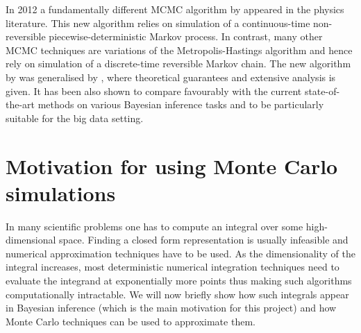 \documentclass[report.tex]{subfiles}
\begin{document}
In 2012 a fundamentally different MCMC algorithm by \citet{peters2012rejection}
appeared in the physics literature. This new algorithm relies on simulation of
a continuous-time non-reversible piecewise-deterministic Markov process. In
contrast, many other MCMC techniques are variations of the
Metropolis-Hastings algorithm and hence rely on simulation of a discrete-time
reversible Markov chain. The new algorithm by \citet{peters2012rejection}
was generalised by \citet{bouchard2015bouncy},
where theoretical guarantees and extensive analysis is given.
It has been also shown to compare favourably with the current
state-of-the-art methods on various Bayesian inference tasks and to be
particularly suitable for the big data setting.


\section{Motivation for using Monte Carlo simulations}

In many scientific problems one has to compute an integral over some
high-dimensional space.
Finding a closed form representation is usually infeasible and numerical
approximation techniques have to be used.
As the dimensionality of the integral increases, most deterministic
numerical integration techniques need to evaluate the integrand at exponentially
more points thus making such algorithms computationally intractable.
We will now briefly show how such integrals appear in Bayesian inference
(which is the main motivation for this project)
and how Monte Carlo techniques can be used to approximate
them.
\end{document}
